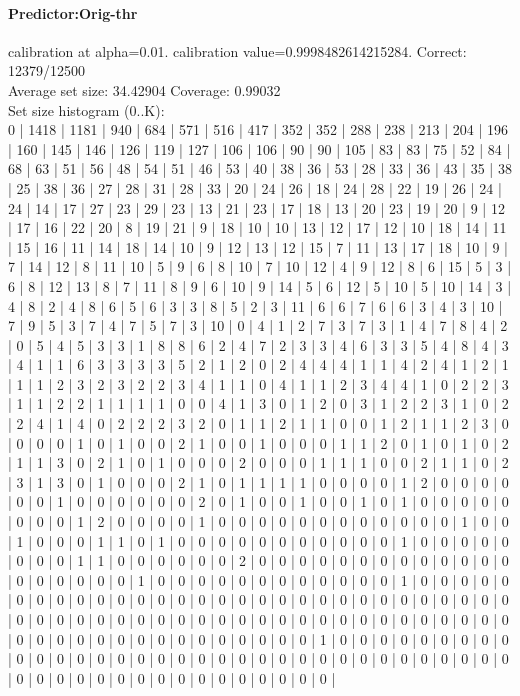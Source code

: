 \documentclass[parskip=half]{scrartcl}
\begin{document}
\paragraph{Predictor:Orig-thr} calibration at alpha=0.01. calibration value=0.9998482614215284. Correct: 12379/12500\\
Average set size: 34.42904   Coverage: 0.99032\\
Set size histogram (0..K):\\
0 | 1418 | 1181 | 940 | 684 | 571 | 516 | 417 | 352 | 352 | 288 | 238 | 213 | 204 | 196 | 160 | 145 | 146 | 126 | 119 | 127 | 106 | 106 | 90 | 90 | 105 | 83 | 83 | 75 | 52 | 84 | 68 | 63 | 51 | 56 | 48 | 54 | 51 | 46 | 53 | 40 | 38 | 36 | 53 | 28 | 33 | 36 | 43 | 35 | 38 | 25 | 38 | 36 | 27 | 28 | 31 | 28 | 33 | 20 | 24 | 26 | 18 | 24 | 28 | 22 | 19 | 26 | 24 | 24 | 14 | 17 | 27 | 23 | 29 | 23 | 13 | 21 | 23 | 17 | 18 | 13 | 20 | 23 | 19 | 20 | 9 | 12 | 17 | 16 | 22 | 20 | 8 | 19 | 21 | 9 | 18 | 10 | 10 | 13 | 12 | 17 | 12 | 10 | 18 | 14 | 11 | 15 | 16 | 11 | 14 | 18 | 14 | 10 | 9 | 12 | 13 | 12 | 15 | 7 | 11 | 13 | 17 | 18 | 10 | 9 | 7 | 14 | 12 | 8 | 11 | 10 | 5 | 9 | 6 | 8 | 10 | 7 | 10 | 12 | 4 | 9 | 12 | 8 | 6 | 15 | 5 | 3 | 6 | 8 | 12 | 13 | 8 | 7 | 11 | 8 | 9 | 6 | 10 | 9 | 14 | 5 | 6 | 12 | 5 | 10 | 5 | 10 | 14 | 3 | 4 | 8 | 2 | 4 | 8 | 6 | 5 | 6 | 3 | 3 | 8 | 5 | 2 | 3 | 11 | 6 | 6 | 7 | 6 | 6 | 3 | 4 | 3 | 10 | 7 | 9 | 5 | 3 | 7 | 4 | 7 | 5 | 7 | 3 | 10 | 0 | 4 | 1 | 2 | 7 | 3 | 7 | 3 | 1 | 4 | 7 | 8 | 4 | 2 | 0 | 5 | 4 | 5 | 3 | 3 | 1 | 8 | 8 | 6 | 2 | 4 | 7 | 2 | 3 | 3 | 4 | 6 | 3 | 3 | 5 | 4 | 8 | 4 | 3 | 4 | 1 | 1 | 6 | 3 | 3 | 3 | 3 | 5 | 2 | 1 | 2 | 0 | 2 | 4 | 4 | 4 | 1 | 1 | 4 | 2 | 4 | 1 | 2 | 1 | 1 | 1 | 2 | 3 | 2 | 3 | 2 | 2 | 3 | 4 | 1 | 1 | 0 | 4 | 1 | 1 | 2 | 3 | 4 | 4 | 1 | 0 | 2 | 2 | 3 | 1 | 1 | 2 | 2 | 1 | 1 | 1 | 1 | 0 | 0 | 4 | 1 | 3 | 0 | 1 | 2 | 0 | 3 | 1 | 2 | 2 | 3 | 1 | 0 | 2 | 2 | 4 | 1 | 4 | 0 | 2 | 2 | 2 | 3 | 2 | 0 | 1 | 1 | 2 | 1 | 1 | 0 | 0 | 1 | 2 | 1 | 1 | 2 | 3 | 0 | 0 | 0 | 0 | 1 | 0 | 1 | 0 | 0 | 2 | 1 | 0 | 0 | 1 | 0 | 0 | 0 | 1 | 1 | 2 | 0 | 1 | 0 | 1 | 0 | 2 | 1 | 1 | 3 | 0 | 2 | 1 | 0 | 1 | 0 | 0 | 0 | 2 | 0 | 0 | 0 | 1 | 1 | 1 | 0 | 0 | 2 | 1 | 1 | 0 | 2 | 3 | 1 | 3 | 0 | 1 | 0 | 0 | 0 | 2 | 1 | 0 | 1 | 1 | 1 | 1 | 0 | 0 | 0 | 0 | 1 | 2 | 0 | 0 | 0 | 0 | 0 | 0 | 1 | 0 | 0 | 0 | 0 | 0 | 0 | 2 | 0 | 1 | 0 | 0 | 1 | 0 | 0 | 1 | 0 | 1 | 0 | 0 | 0 | 0 | 0 | 0 | 0 | 0 | 1 | 2 | 0 | 0 | 0 | 0 | 1 | 0 | 0 | 0 | 0 | 0 | 0 | 0 | 0 | 0 | 0 | 0 | 0 | 1 | 0 | 0 | 1 | 0 | 0 | 0 | 1 | 1 | 0 | 1 | 0 | 0 | 0 | 0 | 0 | 0 | 0 | 0 | 0 | 0 | 0 | 1 | 0 | 0 | 0 | 0 | 0 | 0 | 0 | 0 | 1 | 1 | 0 | 0 | 0 | 0 | 0 | 0 | 2 | 0 | 0 | 0 | 0 | 0 | 0 | 0 | 0 | 0 | 0 | 0 | 0 | 0 | 0 | 0 | 0 | 0 | 0 | 0 | 1 | 0 | 0 | 0 | 0 | 0 | 0 | 0 | 0 | 0 | 0 | 0 | 0 | 1 | 0 | 0 | 0 | 0 | 0 | 0 | 0 | 0 | 0 | 0 | 0 | 0 | 0 | 0 | 0 | 0 | 0 | 0 | 0 | 0 | 0 | 0 | 0 | 0 | 0 | 0 | 0 | 0 | 0 | 0 | 0 | 0 | 0 | 0 | 0 | 0 | 0 | 0 | 0 | 0 | 0 | 0 | 0 | 0 | 0 | 0 | 0 | 0 | 0 | 0 | 0 | 0 | 0 | 0 | 0 | 0 | 0 | 0 | 0 | 0 | 0 | 0 | 0 | 0 | 0 | 0 | 0 | 0 | 0 | 0 | 1 | 0 | 0 | 0 | 0 | 0 | 0 | 0 | 0 | 0 | 0 | 0 | 0 | 0 | 0 | 0 | 0 | 0 | 0 | 0 | 0 | 0 | 0 | 0 | 0 | 0 | 0 | 0 | 0 | 0 | 0 | 0 | 0 | 0 | 0 | 0 | 0 | 0 | 0 | 0 | 0 | 0 | 0 | 0 | 0 | 0 | 0 | 0 | 0 | 0 | 0 | 
\end{document}
